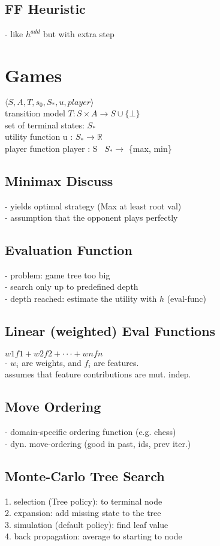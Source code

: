\subsection*{FF Heuristic}
- like $h^{add}$  but with extra step


\section*{Games}
$\langle S, A, T , s_0, S_{*}, u, player \rangle $ \\
transition model $T: S \times A \rightarrow S \cup \{\bot\}$ \\
set of terminal states: $S_{*}$ \\
utility function u : $S_{*} \rightarrow \mathbb{R}$ \\
player function player : S \ $S_{*} \rightarrow $ \{max, min\}

\subsection*{Minimax Discuss}
- yields optimal strategy (Max at least root val)\\
- assumption that the opponent plays perfectly


\subsection*{Evaluation Function}
- problem: game tree too big \\
- search only up to predefined depth \\
- depth reached: estimate the utility with $h$ (eval-func)
\subsection*{Linear (weighted) Eval Functions}
$w1f1 + w2f2 + · · · + wnfn$ \\
- $w_i$ are weights, and $f_i$ are features. \\
assumes that feature contributions are mut. indep.

\subsection*{Move Ordering}
- domain-specific ordering function (e.g. chess) \\
- dyn. move-ordering (good in past, ids, prev iter.)

\subsection*{Monte-Carlo Tree Search}
1. selection (Tree policy): to terminal node \\
2. expansion: add missing state to the tree \\
3. simulation (default policy): find leaf value \\
4. back propagation: average to starting to node